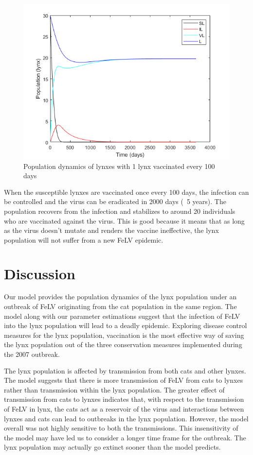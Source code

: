 \documentclass[12pt]{article}
\begin{document}
\begin{figure}[!ht]
    \centering
    \includegraphics[scale=0.75]{images/vaccination.png}
    \caption{Population dynamics of lynxes with 1 lynx vaccinated every 100 days}
    \label{fig:my_label}
\end{figure}

\quad When the susceptible lynxes are vaccinated once every 100 days, the infection can be controlled and the virus can be eradicated in 2000 days (~5 years). The population recovers from the infection and stabilizes to around 20 individuals who are vaccinated against the virus. This is good because it means that as long as the virus doesn't mutate and renders the vaccine ineffective, the lynx population will not suffer from a new FeLV epidemic.



\section{Discussion}

\quad Our model provides the population dynamics of the lynx population under an outbreak of FeLV originating from the cat population in the same region. The model along with our parameter estimations suggest that the infection of FeLV into the lynx population will lead to a deadly epidemic. Exploring disease control measures for the lynx population, vaccination is the most effective way of saving the lynx population out of the three conservation measures implemented during the 2007 outbreak.\cite{lopez_management_2009}  

\quad The lynx population is affected by transmission from both cats and other lynxes. The model suggests that there is more transmission of FeLV  from cats to lynxes rather than transmission within the lynx population. The greater effect of transmission from cats to lynxes indicates that, with respect to the transmission of FeLV in lynx, the cats act as a reservoir of the virus and interactions between lynxes and cats can lead to outbreaks in the lynx population. However, the model overall was not highly sensitive to both the transmissions. This insensitivity of the model  may have led us to consider a longer time frame for the outbreak. The lynx population may actually go extinct sooner than the model predicts.\\
\end{document}
